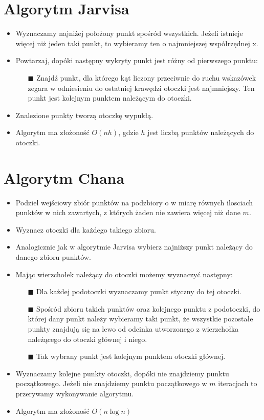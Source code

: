 \documentclass[12pt]{article}
\begin{document}
\section{Algorytm Jarvisa}
\begin{itemize}
\item Wyznaczamy najniżej położony punkt spośród wszystkich. Jeżeli istnieje więcej niż jeden taki punkt, to wybieramy ten o najmniejszej współrzędnej x.
\item Powtarzaj, dopóki następny wykryty punkt jest różny od pierwszego punktu:
\begin{itemize}
\item[$\blacksquare$] Znajdź punkt,  dla którego kąt liczony przeciwnie do ruchu wskazówek zegara w odniesieniu do ostatniej krawędzi otoczki jest najmniejszy. Ten punkt jest kolejnym punktem należącym do otoczki.
\end{itemize}
\item Znalezione punkty tworzą otoczkę wypukłą.
\item Algorytm ma złożoność $O(nh)$, gdzie $h$ jest liczbą punktów należących do otoczki.
\end{itemize}

\newpage
\section{Algorytm Chana}
\begin{itemize}
\item Podziel wejściowy zbiór punktów na podzbiory o w miarę równych ilosciach punktów w nich zawartych, z których żaden nie zawiera więcej niż dane $m$.
\item Wyznacz otoczki dla każdego takiego zbioru.
\item Analogicznie jak w algorytmie Jarvisa wybierz najniższy punkt należący do danego zbioru punktów.
\item Mając wierzchołek należący do otoczki możemy wyznaczyć następny:
\begin{itemize}
\item[$\blacksquare$] Dla każdej podotoczki wyznaczamy punkt styczny do tej otoczki.
\item[$\blacksquare$] Spośród zbioru takich punktów oraz kolejnego punktu z podotoczki, do której dany punkt należy wybieramy taki punkt, że wszystkie pozostałe punkty znajdują się na lewo od odcinka utworzonego z wierzchołka należącego do otoczki głównej i niego.
\item[$\blacksquare$] Tak wybrany punkt jest kolejnym punktem otoczki głównej.
\end{itemize}
\item Wyznaczamy kolejne punkty otoczki, dopóki nie znajdziemy punktu początkowego. Jeżeli nie znajdziemy punktu początkowego w $m$ iteracjach to przerywamy wykonywanie algorytmu.
\item Algorytm ma złożoność $O(n\log n)$
\end{itemize}
\newpage
\end{document}
